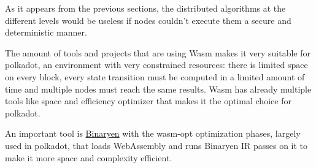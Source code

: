 \documentclass[../main.tex]{subfiles}
\begin{document}
As it appears from the previous sections, the distributed algorithms at the different levels would be useless if nodes couldn't execute them a secure and deterministic manner.

The amount of tools and projects that are using Wasm makes it very suitable for polkadot, an environment with very constrained resources: there is limited space on every block, every state transition must be computed in a limited amount of time and multiple nodes must reach the same results. Wasm has already multiple tools like space and efficiency optimizer that makes it the optimal choice for polkadot.

An important tool is \href{https://github.com/WebAssembly/binaryen}{Binaryen} with the wasm-opt optimization phases, largely used in polkadot, that loads WebAssembly and runs Binaryen IR passes on it to make it more space and complexity efficient.


\end{document}

